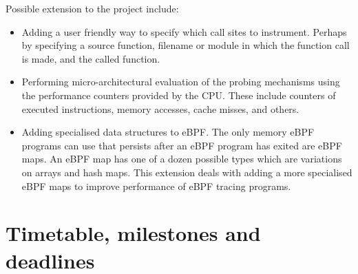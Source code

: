     Possible extension to the project include:
    \begin{itemize}
        \item Adding a user friendly way to specify which call sites to instrument. Perhaps by specifying a
        source function, filename or module in which the function call is made, and the called function.

        \item Performing micro-architectural evaluation of the probing mechanisms using the performance counters
        provided by the CPU. These include counters of executed instructions, memory accesses, cache misses, and others.
        
        \item Adding specialised data structures to eBPF. The only memory eBPF programs can use that persists after an
        eBPF program has exited are eBPF maps. An eBPF map has one of a dozen possible types which are variations
        on arrays and hash maps. This extension deals with adding a more specialised eBPF maps to improve performance
        of eBPF tracing programs.
    \end{itemize}

\section*{Timetable, milestones and deadlines}

